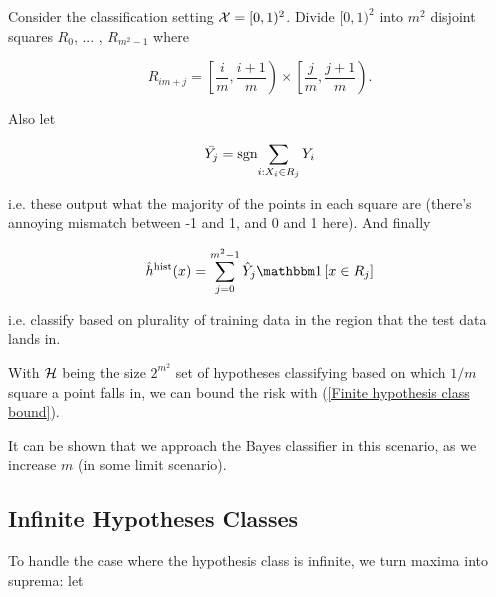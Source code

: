 \documentclass[11pt]{scrartcl}
\begin{document}
\begin{example}
\label{the histogram classifier}
Consider the classification setting $\mathcal{X} = [0,1)^2$. Divide $[0,1)^2$ into $m^2$ disjoint squares $R_0$, ... , $R_{m^2-1}$ where

\begin{equation}
    R_{im + j} = \left[ \frac{i}{m}, \frac{i+1}{m} \right) \times \left[ \frac{j}{m}, \frac{j+1}{m} \right).
\end{equation}

Also let 

\begin{equation}
    \bar{Y_j} = \text{sgn}{\sum_{i: X_i \in R_j} Y_i}
\end{equation}

i.e. these output what the majority of the points in each square are (there's annoying mismatch between -1 and 1, and 0 and 1 here). And finally

\begin{equation}
    \hat{h}^\text{hist}(x) = \sum_{j=0}^{m^2-1} \hat{Y}_j \one{x \in R_j}
\end{equation}

i.e. classify based on plurality of training data in the region that the test data lands in.


With $\mathcal{H}$ being the size $2^{m^2}$ set of hypotheses classifying based on which $1/m$ square a point falls in, we can bound the risk with (\ref{Finite hypothesis class bound}).

It can be shown that we approach the Bayes classifier in this scenario, as we increase $m$ (in some limit scenario).
\end{example}

\subsection{Infinite Hypotheses Classes}

To handle the case where the hypothesis class is infinite, we turn maxima into suprema: let
\end{document}
